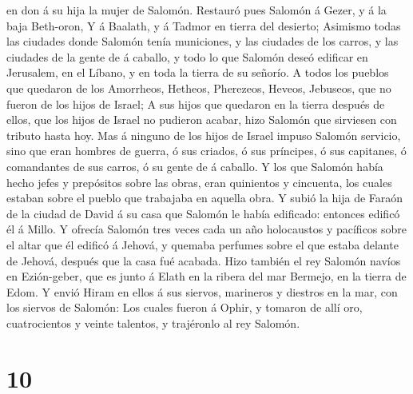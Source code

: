 en don á su hija la mujer de Salomón.  Restauró pues
Salomón á Gezer, y á la baja Beth-oron,  Y á Baalath, y á
Tadmor en tierra del desierto;  Asimismo todas las ciudades
donde Salomón tenía municiones, y las ciudades de los carros, y las
ciudades de la gente de á caballo, y todo lo que Salomón deseó edificar
en Jerusalem, en el Líbano, y en toda la tierra de su señorío.
 A todos los pueblos que quedaron de los Amorrheos,
Hetheos, Pherezeos, Heveos, Jebuseos, que no fueron de los hijos de
Israel;  A sus hijos que quedaron en la tierra después de
ellos, que los hijos de Israel no pudieron acabar, hizo Salomón que
sirviesen con tributo hasta hoy.  Mas á ninguno de los
hijos de Israel impuso Salomón servicio, sino que eran hombres de
guerra, ó sus criados, ó sus príncipes, ó sus capitanes, ó comandantes
de sus carros, ó su gente de á caballo.  Y los que Salomón
había hecho jefes y prepósitos sobre las obras, eran quinientos y
cincuenta, los cuales estaban sobre el pueblo que trabajaba en aquella
obra.  Y subió la hija de Faraón de la ciudad de David á su
casa que Salomón le había edificado: entonces edificó él á Millo.
 Y ofrecía Salomón tres veces cada un año holocaustos y
pacíficos sobre el altar que él edificó á Jehová, y quemaba perfumes
sobre el que estaba delante de Jehová, después que la casa fué acabada.
 Hizo también el rey Salomón navíos en Ezión-geber, que es
junto á Elath en la ribera del mar Bermejo, en la tierra de Edom.
 Y envió Hiram en ellos á sus siervos, marineros y diestros
en la mar, con los siervos de Salomón:  Los cuales fueron á
Ophir, y tomaron de allí oro, cuatrocientos y veinte talentos, y
trajéronlo al rey Salomón.

\hypertarget{section-9}{%
\section{10}\label{section-9}}

